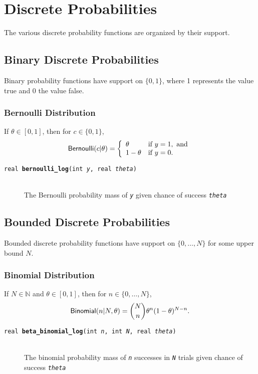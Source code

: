 \documentclass[10pt]{report}
\newcommand{\distro}[1]{\mbox{\sf #1}}
\newcommand{\setlist}[1]{\{ #1 \}}
\newcommand{\nats}{\mathbb{N}}
\newcommand{\fitem}[4]{\item[{\tt #1 {\bfseries #2}(#3)}]\mbox{ } \\[4pt] #4}
\newcommand{\farg}[1]{{\tt\slshape #1}}
\begin{document}
\chapter{Discrete Probabilities}\label{discrete-prob-functions.chapter}

The various discrete probability functions are organized by their
support.

\section{Binary Discrete Probabilities}

Binary probability functions have support on $\setlist{0,1}$, where 1
represents the value true and 0 the value false.

\subsection{Bernoulli Distribution}

If $\theta \in [0,1]$, then for $c \in \setlist{0,1}$, 
\[
\distro{Bernoulli}(c|\theta)
=
\left\{
\begin{array}{ll}
\theta & \mbox{if } y = 1, \mbox{ and}
\\
1 - \theta & \mbox{if } y = 0.
\end{array}
\right.
\]
\begin{description}
%
 \fitem{real}{bernoulli\_log}{int \farg{y}, real \farg{theta}}{The
   Bernoulli probability mass of \farg{y} given chance of success
   \farg{theta}}
%
\end{description}

\section{Bounded Discrete Probabilities}\label{betafun.section}

Bounded discrete probability functions have support on
$\setlist{0,\ldots,N}$ for some upper bound $N$.

\subsection{Binomial Distribution}

If $N \in \nats$ and $\theta \in [0,1]$, then for $n \in
\{0,\ldots,N\}$,
\[
\distro{Binomial}(n|N,\theta)
= {N \choose n} \theta^n (1 - \theta)^{N - n}.
\]

\begin{description}
%
  \fitem{real}{beta\_binomial\_log}{int \farg{n}, int \farg{N}, real
    \farg{theta}}{The binomial probability mass of \farg{n}
    successes in \farg{N} trials given chance of success \farg{theta}}
%
\end{description}
\end{document}

